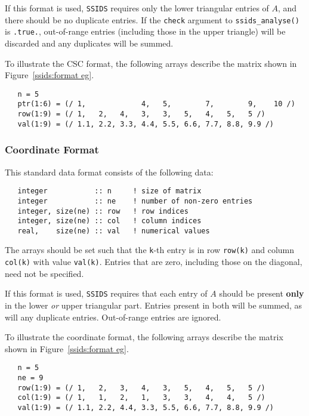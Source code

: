 If this format is used, \texttt{SSIDS} requires only the lower triangular entries of $A$, and there 
should be no duplicate entries. If the \texttt{check}
argument to
\texttt{ssids\_analyse()} is \texttt{.true.}, out-of-range entries (including
those in the upper triangle) will be discarded and any duplicates will be
summed.

To illustrate the CSC format, the following arrays describe the matrix shown in
Figure~\ref{ssids:format eg}.
\begin{verbatim}
   n = 5
   ptr(1:6) = (/ 1,             4,   5,        7,        9,    10 /)
   row(1:9) = (/ 1,   2,   4,   3,   3,   5,   4,   5,   5 /)
   val(1:9) = (/ 1.1, 2.2, 3.3, 4.4, 5.5, 6.6, 7.7, 8.8, 9.9 /)
\end{verbatim}

\subsubsection{Coordinate Format} \label{ssids:coordformat}
This standard data format consists of the following data:
\begin{verbatim}
   integer           :: n     ! size of matrix
   integer           :: ne    ! number of non-zero entries
   integer, size(ne) :: row   ! row indices
   integer, size(ne) :: col   ! column indices
   real,    size(ne) :: val   ! numerical values
\end{verbatim}
The arrays should be set such that the \texttt{k}-th entry is in row
\texttt{row(k)} and column \texttt{col(k)} with value \texttt{val(k)}.
Entries that are zero, including those on the diagonal, need not be specified.

If this format is used,
\texttt{SSIDS} requires that each entry of $A$ should be present \textbf{only} in the
lower \textit{or} upper triangular part. Entries present in both will be summed, as
will any duplicate entries. Out-of-range entries are ignored.

To illustrate the coordinate format, the following arrays describe the matrix shown in
Figure~\ref{ssids:format eg}.
\begin{verbatim}
   n = 5
   ne = 9
   row(1:9) = (/ 1,   2,   3,   4,   3,   5,   4,   5,   5 /)
   col(1:9) = (/ 1,   1,   2,   1,   3,   3,   4,   4,   5 /)
   val(1:9) = (/ 1.1, 2.2, 4.4, 3.3, 5.5, 6.6, 7.7, 8.8, 9.9 /)
\end{verbatim}


